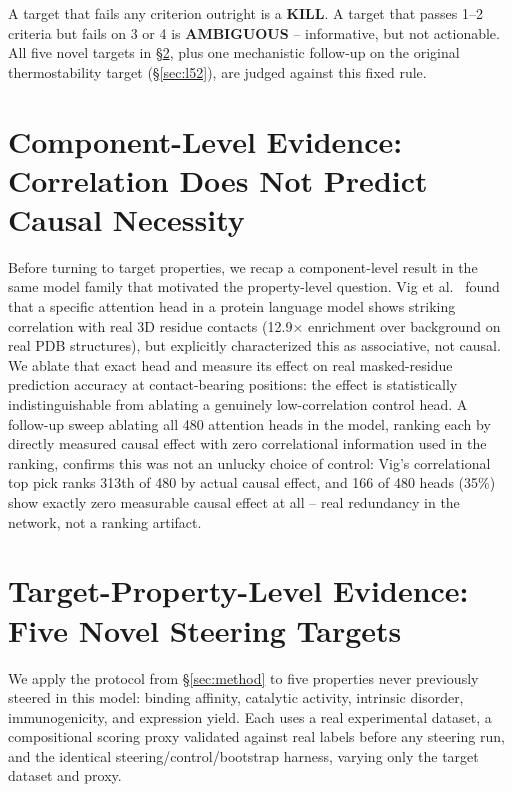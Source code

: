 \documentclass{article}
\begin{document}
A target that fails any criterion outright is a \textbf{KILL}. A target
that passes 1--2 criteria but fails on 3 or 4 is
\textbf{AMBIGUOUS} -- informative, but not actionable. All five novel
targets in \S\ref{sec:sweep}, plus one mechanistic follow-up on the
original thermostability target (\S\ref{sec:l52}), are judged against
this fixed rule.

\section{Component-Level Evidence: Correlation Does Not Predict Causal
  Necessity}
\label{sec:component}

Before turning to target properties, we recap a component-level result
in the same model family that motivated the property-level question.
Vig et al.\ \citep{vig2021bertology} found that a specific attention
head in a protein language model shows striking correlation with real
3D residue contacts (12.9$\times$ enrichment over background on real PDB
structures), but explicitly characterized this as associative, not
causal. We ablate that exact head and measure its effect on real
masked-residue prediction accuracy at contact-bearing positions: the
effect is statistically indistinguishable from ablating a genuinely
low-correlation control head. A follow-up sweep ablating all 480
attention heads in the model, ranking each by directly measured causal
effect with zero correlational information used in the ranking, confirms
this was not an unlucky choice of control: Vig's correlational top pick
ranks 313th of 480 by actual causal effect, and 166 of 480 heads (35\%)
show exactly zero measurable causal effect at all -- real redundancy in
the network, not a ranking artifact.

\section{Target-Property-Level Evidence: Five Novel Steering Targets}
\label{sec:sweep}

We apply the protocol from \S\ref{sec:method} to five properties never
previously steered in this model: binding affinity, catalytic activity,
intrinsic disorder, immunogenicity, and expression yield. Each uses a
real experimental dataset, a compositional scoring proxy validated
against real labels before any steering run, and the identical
steering/control/bootstrap harness, varying only the target dataset and
proxy.
\end{document}

